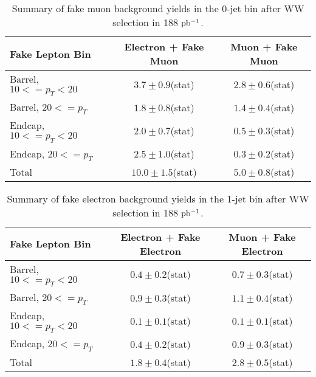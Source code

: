 \begin{table}[!htbp]
\begin{center}
\begin{tabular}{|l|c|c|}
\hline
Fake Lepton Bin               & Electron + Fake Muon & Muon + Fake Muon  \\
\hline
Barrel, $10 <= p_{T} < 20$    &  $3.7 \pm 0.9$(stat)	 &   $2.8 \pm 0.6$(stat) \\
Barrel, $20 <= p_{T} $        &  $1.8 \pm 0.8$(stat)	 &   $1.4 \pm 0.4$(stat) \\
Endcap, $10 <= p_{T} < 20$    &  $2.0 \pm 0.7$(stat)	 &   $0.5 \pm 0.3$(stat) \\
Endcap, $20 <= p_{T} $        &  $2.5 \pm 1.0$(stat)	 &   $0.3 \pm 0.2$(stat) \\
\hline
Total                         & $10.0 \pm 1.5$(stat)     &   $5.0 \pm 0.8$(stat) \\
\hline
\end{tabular}
\caption{Summary of fake muon background yields in the 0-jet bin after WW selection in 188 $\mathrm{pb^{-1}}$.}
\label{tab:FakeMuonBkgPrediction_WWSelection_0JetBin}
\end{center}
\end{table}



\begin{table}[!htbp]
\begin{center}
\begin{tabular}{|l|c|c|}
\hline
Fake Lepton Bin               & Electron + Fake Electron & Muon + Fake Electron  \\
\hline
Barrel, $10 <= p_{T} < 20$    &  $0.4 \pm 0.2$(stat)	 &   $0.7 \pm 0.3$(stat) \\
Barrel, $20 <= p_{T} $        &  $0.9 \pm 0.3$(stat)	 &   $1.1 \pm 0.4$(stat) \\
Endcap, $10 <= p_{T} < 20$    &  $0.1 \pm 0.1$(stat)     &   $0.1 \pm 0.1$(stat) \\
Endcap, $20 <= p_{T} $        &  $0.4 \pm 0.2$(stat)	 &   $0.9 \pm 0.3$(stat) \\
\hline
Total                         &  $1.8 \pm 0.4$(stat)     &   $2.8 \pm 0.5$(stat) \\
\hline
\end{tabular}
\caption{Summary of fake electron background yields in the 1-jet bin after WW selection in 188 $\mathrm{pb^{-1}}$.}
\label{tab:FakeElectronBkgPrediction_WWSelection_1JetBin}
\end{center}
\end{table}


